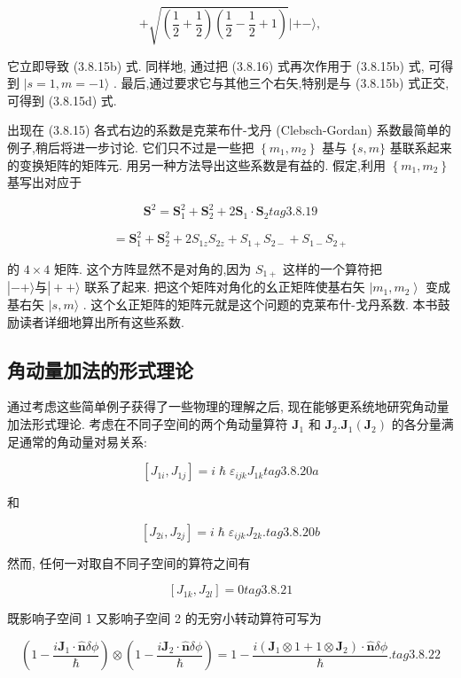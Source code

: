 $$
+ \sqrt{\left( {\frac{1}{2} + \frac{1}{2}}\right) \left( {\frac{1}{2} - \frac{1}{2} + 1}\right) }| + - \rangle ,
$$

它立即导致 (3.8.15b) 式. 同样地, 通过把 (3.8.16) 式再次作用于 (3.8.15b) 式, 可得到 $|s = 1, m = - 1\rangle$ . 最后,通过要求它与其他三个右矢,特别是与 (3.8.15b) 式正交, 可得到 (3.8.15d) 式.

出现在 (3.8.15) 各式右边的系数是克莱布什-戈丹 (Clebsch-Gordan) 系数最简单的例子,稍后将进一步讨论. 它们只不过是一些把 $\left\{ {{m}_{1},{m}_{2}}\right\}$ 基与 $\{ s, m\}$ 基联系起来的变换矩阵的矩阵元. 用另一种方法导出这些系数是有益的. 假定,利用 $\left\{ {{m}_{1},{m}_{2}}\right\}$ 基写出对应于

$$
{\mathbf{S}}^{2} = {\mathbf{S}}_{1}^{2} + {\mathbf{S}}_{2}^{2} + 2{\mathbf{S}}_{1} \cdot {\mathbf{S}}_{2} tag{3.8.19}
$$

$$
= {\mathbf{S}}_{1}^{2} + {\mathbf{S}}_{2}^{2} + 2{S}_{1z}{S}_{2z} + {S}_{1 + }{S}_{2 - } + {S}_{1 - }{S}_{2 + }
$$

的 $4 \times 4$ 矩阵. 这个方阵显然不是对角的,因为 ${S}_{1 + }$ 这样的一个算符把 $\left| {- + \rangle \text{与}}\right| + + \rangle$ 联系了起来. 把这个矩阵对角化的幺正矩阵使基右矢 $\left| {{m}_{1},{m}_{2}}\right\rangle$ 变成基右矢 $|s, m\rangle$ . 这个幺正矩阵的矩阵元就是这个问题的克莱布什-戈丹系数. 本书鼓励读者详细地算出所有这些系数.

\subsection{角动量加法的形式理论}

通过考虑这些简单例子获得了一些物理的理解之后, 现在能够更系统地研究角动量加法形式理论. 考虑在不同子空间的两个角动量算符 ${\mathbf{J}}_{1}$ 和 ${\mathbf{J}}_{2}.{\mathbf{J}}_{1}\left( {\mathbf{J}}_{2}\right)$ 的各分量满足通常的角动量对易关系:

$$
\left\lbrack {{J}_{1i},{J}_{1j}}\right\rbrack = i\hslash {\varepsilon }_{ijk}{J}_{1k} tag{3.8.20a}
$$

和

$$
\left\lbrack {{J}_{2i},{J}_{2j}}\right\rbrack = i\hslash {\varepsilon }_{ijk}{J}_{2k}. tag{3.8.20b}
$$

然而, 任何一对取自不同子空间的算符之间有

$$
\left\lbrack {{J}_{1k},{J}_{2l}}\right\rbrack = 0 tag{3.8.21}
$$

既影响子空间 1 又影响子空间 2 的无穷小转动算符可写为

$$
\left( {1 - \frac{i{\mathbf{J}}_{1} \cdot \widehat{\mathbf{n}}{\delta \phi }}{\hslash }}\right) \otimes \left( {1 - \frac{i{\mathbf{J}}_{2} \cdot \widehat{\mathbf{n}}{\delta \phi }}{\hslash }}\right) = 1 - \frac{i\left( {{\mathbf{J}}_{1} \otimes 1 + 1 \otimes {\mathbf{J}}_{2}}\right) \cdot \widehat{\mathbf{n}}{\delta \phi }}{\hslash }. tag{3.8.22}
$$

